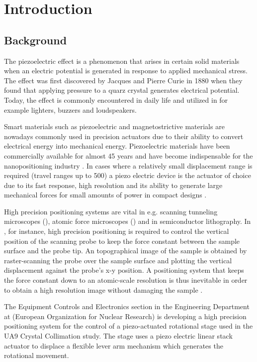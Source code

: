 \chapter{Introduction}\label{cha:intro}

\section{Background}
The piezoelectric effect is a phenomenon that arises in certain solid materials when an electric potential is generated in response to applied mechanical stress. The effect was first discovered by Jacques and Pierre Curie in 1880 when they found that applying pressure to a quarz crystal generates electrical potential. Today, the effect is commonly encountered in daily life and utilized in for example lighters, buzzers and loudspeakers.

Smart materials such as piezoelectric and magnetostrictive materials are nowadays commonly used in precision actuators due to their ability to convert electrical energy into mechanical energy. Piezoelectric materials have been commercially available for almost 45 years and have become indispensable for the nanopositioning industry \citep{Piezo:2008}. In cases where a relatively small displacement range is required (travel ranges up to \unit{500}{\micro\meter}) a piezo electric device is the actuator of choice due to its fast response, high resolution and its ability to generate large mechanical forces for small amounts of power in compact designs \citep{SurveyOfControlIssues:2007}.

High precision positioning systems are vital in e.g. scanning tunneling microscopes (\abbrSTM), atomic force microscopes (\abbrAFM) and in semiconductor lithography. In \abbrAFM, for instance, high precision positioning is required to control the vertical position of the scanning probe to keep the force constant between the sample surface and the probe tip. An topographical image of the sample is obtained by raster-scanning the probe over the sample surface and plotting the vertical displacement against the probe's x-y position. A positioning system that keeps the force constant down to an atomic-scale resolution is thus inevitable in order to obtain a high resolution image without damaging the sample \citep{SurveyOfControlIssues:2007}.

The Equipment Controls and Electronics section in the Engineering Department at \abbrCERN (European Organization for Nuclear Research) is developing a high precision positioning system for the control of a piezo-actuated rotational stage used in the UA9 Crystal Collimation study. The stage uses a piezo electric linear stack actuator to displace a flexible lever arm mechanism which generates the rotational movement.

